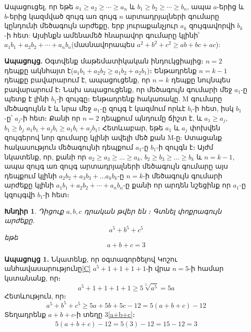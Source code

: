 \documentclass{article}
\newtheorem{problem}{Խնդիր}
\numberwithin{equation}
\begin{document}
Ապացուցել, որ եթե $a_1\ge a_2 \ge \cdots\ge a_n$ և $b_1 \ge b_2 \ge\cdots \ge b_n$, ապա $a$-երից և $b$-երից կազմված զույգ առ
զույգ $n$ արտադրյալների գումարը կընդունի մեծագույն արժեքը, երբ յուրաքանչյուր $a_k$ զույգավորվի
$b_k$-ի հետ: Այսինքն ամենամեծ հնարավոր գումարը կլինի՝ $a_1b_1 + a_2b_2 + ⋯ + a_nb_n$(մասնավորապես $a^2+b^2+c^2\ge ab+bc+ac$):

\textbf{Ապացույց.}
Օգտվենք մաթեմատիկական ինդուկցիայից։ $n=2$ դեպքը ակնհայտ է($a_1b_1+a_2b_2\ge a_1b_2+a_2b_1$)։ Ենթադրենք $n=k-1$ դեպքը բավարարում  է, ապացուցենք, որ $n=k$ դեպքը նույնպես բավարարում է։
Նախ ապացուցենք, որ մեծագույն գումարի մեջ $a_1$-ը պետք է լինի $b_1$-ի զույգը։ Ենթադրենք հակառակը. M գումարը մեծագույնն է և նրա մեջ $a_1$-ը զույգ է կազմում որևէ $b_i$-ի հետ, իսկ $b_1$-ը՝ $a_j$-ի հետ։ Քանի որ $n=2$ դեպքում պնդումը ճիշտ է, և $a_1\ge a_j$, $b_1\ge b_j$ \Rightarrow $a_1b_1+a_jb_i\ge a_1b_i+a_jb_1$։ Հետևաբար, եթե $a_1$ և $a_j$ փոխվեն զույգերով նոր գումարը կլինի ավելի մեծ քան M-ը: Ստացանք հակասություն \Rightarrow մեծագույնի դեպքում $a_1$-ը  $b_1$-ի զույգն է։ Այժմ նկատենք, որ, քանի որ $a_2\ge a_3\ge \ldots \ge a_k $, $b_2\ge b_3\ge \ldots \ge b_k $ և $n=k-1$, ապա զույգ առ զույգ արտադրյալների մեծագույն գումարը այս դեպքում կլինի $a_2b_2+a_3b_3+\ldots a_kb_k$-ը \Rightarrow $n=k$-ի մեծագույն գումարի արժեքը կլինի $a_1b_1 + a_2b_2 + ⋯ + a_nb_n$-ը քանի որ արդեն նշեցինք որ $a_1$-ը կզույգվի $b_1$-ի հետ։

\begin{problem}
Դիցուք $a,b,c$ դրական թվեր են ։ Գտնել փոքրագույն արժեքը.
\begin{equation}
 a^5+b^5+c^5    
\end{equation}
եթե
\begin{equation}\label{a+b+c}
a+b+c=3 
\end{equation}
\end{problem}
\textbf{Ապացույց 1.}
Նկատենք, որ օգտագործելով Կոշու անհավասարությունը\eqref{C} $a^5+1+1+1+1$-ի վրա $n=5$-ի համար կստանանք, որ։
\begin{equation}
a^5+1+1+1+1 \ge 5\sqrt[5]{a^5} = 5a
\end{equation}
Հետևություն, որ։
\begin{equation}
a^5+b^5+c^5 \ge 5a+5b+5c-12=5(a+b+c)-12
\end{equation}
Տեղադրենք $a+b+c$-ի տեղը 3\eqref{a+b+c}։
\begin{align}
5(a+b+c)-12=5(3)-12=15-12=3
\end{align}
\end{document}
